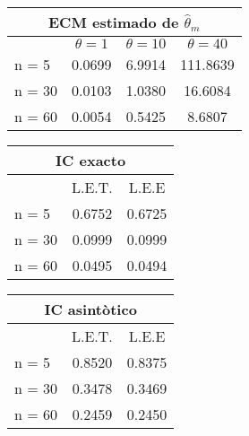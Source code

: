 \documentclass[a4paper,spanish]{report}
\begin{document}
\begin{table}[h!]
	\begin{tabular}{|l | c | c | c |}
		\hline
		\multicolumn{4}{|c|}{ECM estimado de $\hat{\theta}_{m}$} \\	
		\hline
		 & $\theta = 1$ & $\theta = 10$ & $\theta = 40$  \\
		\hline 
		n = 5 & 0.0699 & 6.9914 & 111.8639\\
		\hline
		n = 30 & 0.0103 & 1.0380 & 16.6084\\
		\hline
		n = 60 & 0.0054 & 0.5425 & 8.6807\\
		\hline
	\end{tabular}
\end{table}
\newpage
\begin{table}[h!]
	\begin{tabular}{|l | c | c |}
		\hline
		\multicolumn{3}{|c|}{IC exacto} \\	
		\hline
		 & L.E.T. & L.E.E\\
		\hline 
		n = 5 & 0.6752 & 0.6725\\
		\hline
		n = 30 & 0.0999 & 0.0999\\
		\hline
		n = 60 & 0.0495 & 0.0494\\
		\hline
	\end{tabular}
\end{table}

\begin{table}[h!]
	\begin{tabular}{|l | c | c |}
		\hline
		\multicolumn{3}{|c|}{IC asint\`otico} \\	
		\hline
		 & L.E.T. & L.E.E\\
		\hline 
		n = 5 & 0.8520 & 0.8375\\
		\hline
		n = 30 & 0.3478 & 0.3469\\
		\hline
		n = 60 & 0.2459 & 0.2450\\
		\hline
	\end{tabular}
\end{table}
\end{document}

